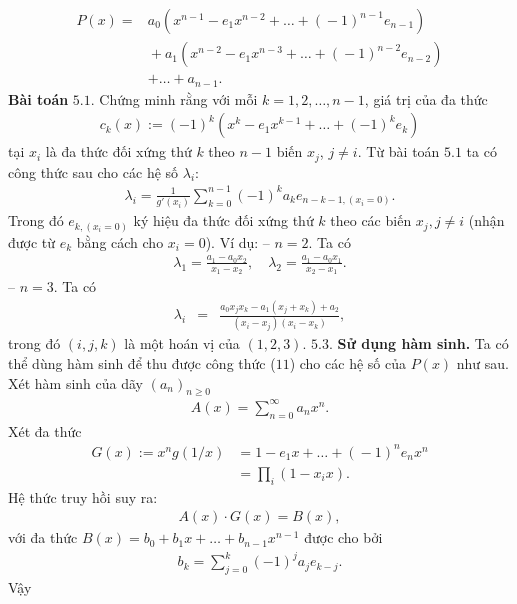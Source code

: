 \begin{multicols}{2}
\begin{align*}
		P(x)=&a_0(x^{n\!-\!1}\!-\!e_1x^{n\!-\!2}\!+\!\ldots\!+\!(\!-\!1)^{n\!-\!1}e_{n\!-\!1})\\
		&\!+\!a_1(x^{n\!-\!2}\!-\!e_1x^{n\!-\!3}\!+\!\ldots\!+\!(\!-\!1)^{n\!-\!2}e_{n\!-\!2})\\
		&+
		\ldots+a_{n-1}.
	\end{align*}
	\textbf{\color{hoccungpi}Bài toán} $\pmb{5.1.}$ Chứng minh rằng với mỗi $k=1,2,\ldots,n-1$, giá trị của đa thức
	\begin{align*}
		c_k(x):=(-1)^k(x^k-e_1x^{k-1}+\ldots+(-1)^ke_k)
	\end{align*}
	tại $x_i$ là đa thức đối xứng thứ $k$ theo $n-1$ biến $x_j$,  $j\neq i$.
	\vskip 0.1cm	
	Từ bài toán $5.1$ ta có công thức sau cho các hệ số $\lambda_i$:
	\begin{align*}
		\lambda_i=\frac{1}{g'(x_i)}\sum_{k=0}^{n-1}(-1)^ka_ke_{n-k-1, (x_i=0)}.
	\end{align*}
	Trong đó $e_{k,(x_i=0)}$ ký hiệu đa thức đối xứng thứ $k$ theo các biến $x_j,j\neq i$ (nhận được từ $e_k$ bằng cách cho $x_i=0$). Ví dụ:
	\vskip 0.1cm
	-- $n=2$. Ta có 
	\begin{align*}
		\lambda_1= \frac{a_1-a_0x_2}{x_1-x_2},\quad 
		\lambda_2=\frac{a_1-a_0x_1}{x_2-x_1}.
	\end{align*}
	-- $n=3$. Ta có
	\begin{align*}
		\lambda_i&=&\frac{a_0x_jx_k-a_1(x_j+x_k)+a_2}{(x_i-x_j)(x_i-x_k)}, 
	\end{align*}
	trong đó $(i,j,k)$ là một hoán vị của $(1,2,3)$.	
	\vskip 0.1cm
	$\pmb{5.3.}$ \textbf{\color{hoccungpi}Sử dụng hàm sinh.}  
	Ta có thể dùng hàm sinh để thu được công thức ($11$) cho các hệ số của $P(x)$  như sau.
	Xét hàm sinh của dãy $(a_n)_{n\geq 0}$
	\begin{align*}
		A(x)=\sum_{n=0}^\infty a_n x^n.
	\end{align*}
	Xét đa thức
	\begin{align*}
		G(x)\!:=\!{ x^ng(1/x)}&=\!1\!-\!e_1x\!+\!\ldots\!+\!(\!-\!1)^n e_n x^n\\
		&=\!\prod_i(1-x_i x).
	\end{align*}
	Hệ thức truy hồi suy ra:
	\begin{align*}
		A(x)\cdot G(x)=B(x),
	\end{align*}
	với đa thức $B(x)=b_0+b_1x+\ldots+b_{n-1}x^{n-1}$ được cho bởi
	\begin{align*}
		b_k=\sum_{j=0}^k (-1)^j a_{j}e_{k-j}.
	\end{align*}
	Vậy
	\begin{align*}

\end{align*}
\end{multicols}
